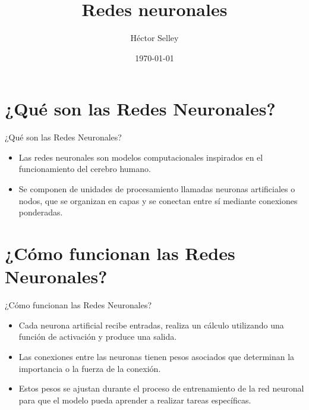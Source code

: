 \documentclass[11pt,aspectratio=169]{beamer}
\author{Héctor Selley}
\title{Redes neuronales}
\institute{Universidad Anáhuac México}
\date{\today}
\begin{document}

\begin{frame}
	\titlepage
\end{frame}


\section{¿Qué son las Redes Neuronales?}
\begin{frame}{¿Qué son las Redes Neuronales?}
	\begin{itemize}
		\item Las redes neuronales son modelos computacionales inspirados en el funcionamiento del cerebro humano. \pause
		\item Se componen de unidades de procesamiento llamadas neuronas artificiales o nodos, que se organizan en 
			capas y se conectan entre sí mediante conexiones ponderadas.
	\end{itemize}
\end{frame}

\section{¿Cómo funcionan las Redes Neuronales?}
\begin{frame}{¿Cómo funcionan las Redes Neuronales?}
	\begin{itemize}
		\item Cada neurona artificial recibe entradas, realiza un cálculo utilizando una función de activación y 
			produce una salida.\pause
		\item Las conexiones entre las neuronas tienen pesos asociados que determinan la importancia o la fuerza de la conexión.\pause 
		\item Estos pesos se ajustan durante el proceso de entrenamiento de la red neuronal para que el modelo pueda aprender a 
			realizar tareas específicas.
	\end{itemize}
\end{frame}
 
\end{document}
